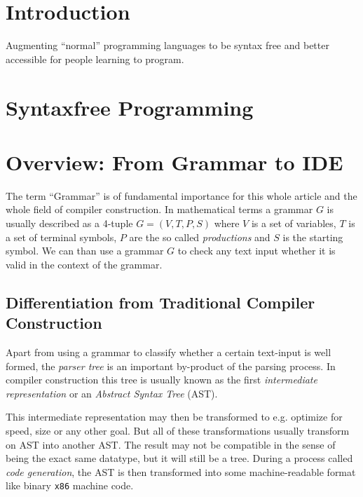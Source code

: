 \section{Introduction}
\label{sec:introduction}

Augmenting \enquote{normal} programming languages to be syntax free and better accessible for people learning to program.

\section{Syntaxfree Programming}
\label{sec:syntaxfree-programming}



\section{Overview: From Grammar to IDE}

The term \enquote{Grammar} is of fundamental importance for this whole article and the whole field of compiler construction. In mathematical terms a grammar $G$ is usually described as a 4-tuple $G = (V, T, P, S)$ where $V$ is a set of variables, $T$ is a set of terminal symbols, $P$ are the so called \textit{productions} and $S$ is the starting symbol\cite[Chapter 5]{hopcroft_formal_languages}. We can than use a grammar $G$ to check any text input whether it is valid in the context of the grammar.

\subsection{Differentiation from Traditional Compiler Construction}

Apart from using a grammar to classify whether a certain text-input is well formed, the \textit{parser tree} is an important by-product of the parsing process. In compiler construction this tree is usually known as the first \textit{intermediate representation} or an \textit{Abstract Syntax Tree} (AST)\cite[Chapter 6]{dragon_book}.

This intermediate representation may then be transformed to e.g. optimize for speed, size or any other goal. But all of these transformations usually transform on AST into another AST. The result may not be compatible in the sense of being the exact same datatype, but it will still be a tree. During a process called \textit{code generation}, the AST is then transformed into some machine-readable format like binary \texttt{x86} machine code\cite[Chapter 8]{dragon_book}.

